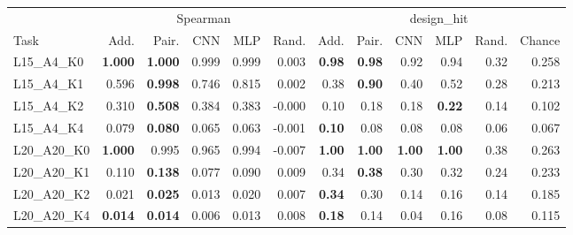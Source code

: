 \begin{tabular}{lrrrrr|rrrrrr}
\toprule
 & \multicolumn{5}{c|}{Spearman} & \multicolumn{6}{c}{design\_hit}\\
Task & Add. & Pair. & CNN & MLP & Rand. & Add. & Pair. & CNN & MLP & Rand. & Chance\\
\midrule
L15\_A4\_K0 & \textbf{1.000} & \textbf{1.000} & 0.999 & 0.999 & 0.003 & \textbf{0.98} & \textbf{0.98} & 0.92 & 0.94 & 0.32 & 0.258\\
L15\_A4\_K1 & 0.596 & \textbf{0.998} & 0.746 & 0.815 & 0.002 & 0.38 & \textbf{0.90} & 0.40 & 0.52 & 0.28 & 0.213\\
L15\_A4\_K2 & 0.310 & \textbf{0.508} & 0.384 & 0.383 & -0.000 & 0.10 & 0.18 & 0.18 & \textbf{0.22} & 0.14 & 0.102\\
L15\_A4\_K4 & 0.079 & \textbf{0.080} & 0.065 & 0.063 & -0.001 & \textbf{0.10} & 0.08 & 0.08 & 0.08 & 0.06 & 0.067\\
\midrule
L20\_A20\_K0 & \textbf{1.000} & 0.995 & 0.965 & 0.994 & -0.007 & \textbf{1.00} & \textbf{1.00} & \textbf{1.00} & \textbf{1.00} & 0.38 & 0.263\\
L20\_A20\_K1 & 0.110 & \textbf{0.138} & 0.077 & 0.090 & 0.009 & 0.34 & \textbf{0.38} & 0.30 & 0.32 & 0.24 & 0.233\\
L20\_A20\_K2 & 0.021 & \textbf{0.025} & 0.013 & 0.020 & 0.007 & \textbf{0.34} & 0.30 & 0.14 & 0.16 & 0.14 & 0.185\\
L20\_A20\_K4 & \textbf{0.014} & \textbf{0.014} & 0.006 & 0.013 & 0.008 & \textbf{0.18} & 0.14 & 0.04 & 0.16 & 0.08 & 0.115\\
\bottomrule
\end{tabular}
